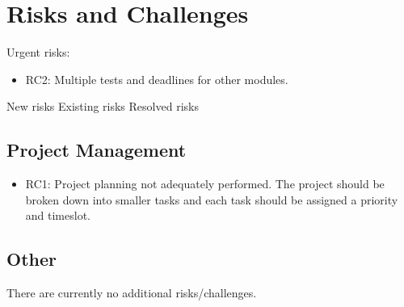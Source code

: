 \documentclass[11pt,a4paper]{article}
\begin{document}
\newpage
\section{Risks and Challenges}
{\color{red} Urgent risks:}
\begin{itemize}
\item{{\color{red} RC2: Multiple tests and deadlines for other modules.}}
\end{itemize}
{\color{orange} New risks}\newline
{\color{brown} Existing risks}\newline
{\color{gray} Resolved risks}

\subsection{Project Management}
\begin{itemize}
\item{{\color{gray} RC1: Project planning not adequately performed. The project should be broken down into smaller tasks and each task should be assigned a priority and timeslot.}}
\end{itemize}

\subsection{Other}
There are currently no additional risks/challenges.


\newpage
% 
\end{document}
